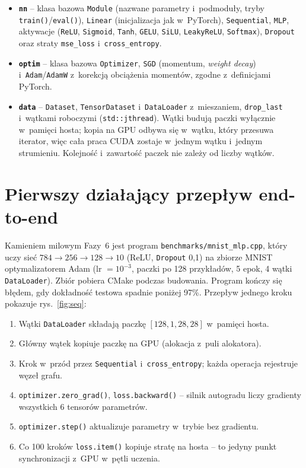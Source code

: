 \documentclass[11pt,a4paper]{article}
\begin{document}
\begin{itemize}[leftmargin=*]
\item \textbf{\texttt{nn}} -- klasa bazowa \texttt{Module} (nazwane parametry i~podmoduły,
  tryby \texttt{train()}/\texttt{eval()}), \texttt{Linear} (inicjalizacja jak w~PyTorch),
  \texttt{Sequential}, \texttt{MLP}, aktywacje (\texttt{ReLU}, \texttt{Sigmoid},
  \texttt{Tanh}, \texttt{GELU}, \texttt{SiLU}, \texttt{LeakyReLU}, \texttt{Softmax}),
  \texttt{Dropout} oraz straty \texttt{mse\_loss} i~\texttt{cross\_entropy}.
\item \textbf{\texttt{optim}} -- klasa bazowa \texttt{Optimizer}, \texttt{SGD} (momentum,
  \emph{weight decay}) i~\texttt{Adam}/\texttt{AdamW} z~korekcją obciążenia
  momentów, zgodne z~definicjami PyTorch.
\item \textbf{\texttt{data}} -- \texttt{Dataset}, \texttt{TensorDataset} i~\texttt{DataLoader}
  z~mieszaniem, \texttt{drop\_last} i~wątkami roboczymi (\texttt{std::jthread}). Wątki
  budują paczki wyłącznie w~pamięci hosta; kopia na GPU odbywa się w~wątku, który
  przesuwa iterator, więc cała praca CUDA zostaje w~jednym wątku i~jednym strumieniu.
  Kolejność i~zawartość paczek nie zależy od liczby wątków.
\end{itemize}

\section{Pierwszy działający przepływ end-to-end}

Kamieniem milowym Fazy~6 jest program \texttt{benchmarks/mnist\_mlp.cpp}, który uczy sieć
$784 \to 256 \to 128 \to 10$ (ReLU, \texttt{Dropout} 0,1) na zbiorze MNIST optymalizatorem
Adam (lr $=10^{-3}$, paczki po 128 przykładów, 5 epok, 4 wątki \texttt{DataLoader}).
Zbiór pobiera CMake podczas budowania. Program kończy się błędem, gdy dokładność testowa
spadnie poniżej 97\%. Przepływ jednego kroku pokazuje rys.~\ref{fig:seq}:

\begin{enumerate}[leftmargin=*]
\item Wątki \texttt{DataLoader} składają paczkę $[128, 1, 28, 28]$ w~pamięci hosta.
\item Główny wątek kopiuje paczkę na GPU (alokacja z~puli alokatora).
\item Krok w~przód przez \texttt{Sequential} i~\texttt{cross\_entropy}; każda operacja
  rejestruje węzeł grafu.
\item \texttt{optimizer.zero\_grad()}, \texttt{loss.backward()} -- silnik autogradu
  liczy gradienty wszystkich 6 tensorów parametrów.
\item \texttt{optimizer.step()} aktualizuje parametry w~trybie bez gradientu.
\item Co 100 kroków \texttt{loss.item()} kopiuje stratę na hosta -- to jedyny punkt
  synchronizacji z~GPU w~pętli uczenia.
\end{enumerate}
\end{document}
